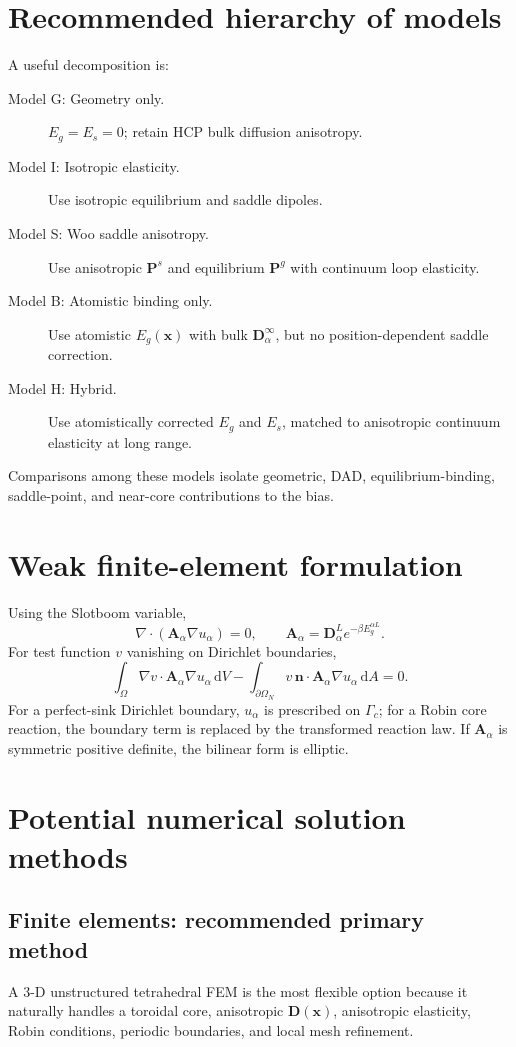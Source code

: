 \documentclass[11pt]{article}
\newcommand{\dd}{\mathrm{d}}
\newcommand{\bD}{\bm{D}}
\newcommand{\bP}{\bm{P}}
\newcommand{\bx}{\bm{x}}
\newcommand{\bn}{\bm{n}}
\newcommand{\cG}{\Gamma}
\newcommand{\cO}{\Omega}
\begin{document}
\section{Recommended hierarchy of models}
A useful decomposition is:
\begin{description}
\item[Model G: Geometry only.] $E_g=E_s=0$; retain HCP bulk diffusion anisotropy.
\item[Model I: Isotropic elasticity.] Use isotropic equilibrium and saddle dipoles.
\item[Model S: Woo saddle anisotropy.] Use anisotropic $\bP^s$ and equilibrium $\bP^g$ with continuum loop elasticity.
\item[Model B: Atomistic binding only.] Use atomistic $E_g(\bx)$ with bulk $\bD_\alpha^\infty$, but no position-dependent saddle correction.
\item[Model H: Hybrid.] Use atomistically corrected $E_g$ and $E_s$, matched to anisotropic continuum elasticity at long range.
\end{description}
Comparisons among these models isolate geometric, DAD, equilibrium-binding, saddle-point, and near-core contributions to the bias.

\section{Weak finite-element formulation}
Using the Slotboom variable,
\begin{equation}
\nabla\cdot(\bm A_\alpha\nabla u_\alpha)=0,
\qquad
\bm A_\alpha=\bD_\alpha^L e^{-\beta E_g^{\alpha L}}.
\end{equation}
For test function $v$ vanishing on Dirichlet boundaries,
\begin{equation}
\boxed{\int_{\cO}\nabla v\cdot\bm A_\alpha\nabla u_\alpha\,\dd V
-\int_{\partial\cO_N}v\,\bn\cdot\bm A_\alpha\nabla u_\alpha\,\dd A=0}.
\end{equation}
For a perfect-sink Dirichlet boundary, $u_\alpha$ is prescribed on $\cG_c$; for a Robin core reaction, the boundary term is replaced by the transformed reaction law. If $\bm A_\alpha$ is symmetric positive definite, the bilinear form is elliptic.

\section{Potential numerical solution methods}
\subsection{Finite elements: recommended primary method}
A 3-D unstructured tetrahedral FEM is the most flexible option because it naturally handles a toroidal core, anisotropic $\bD(\bx)$, anisotropic elasticity, Robin conditions, periodic boundaries, and local mesh refinement.
\end{document}
